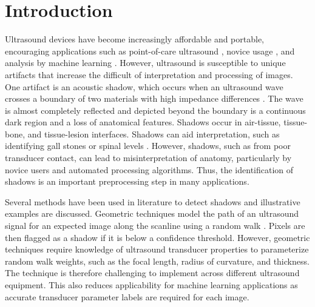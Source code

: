 \documentclass[authoryear,preprint,review,12pt]{elsarticle}
\begin{document}




\section*{Introduction}
\label{intro}
Ultrasound devices have become increasingly affordable and portable, encouraging applications such as point-of-care ultrasound \citep{Bouhemad2011}, novice usage \citep{Sippel2011}, and analysis by machine learning \citep{Ghose2013}. However, ultrasound is susceptible to unique artifacts that increase the difficult of interpretation and processing of images. One artifact is an acoustic shadow, which occurs when an ultrasound wave crosses a boundary of two materials with high impedance differences \citep{Kremkau1986}. The wave is almost completely reflected and depicted beyond the boundary is a continuous dark region and a loss of anatomical features. Shadows occur in air-tissue, tissue-bone, and tissue-lesion interfaces. Shadows can aid interpretation, such as identifying gall stones \citep{Good1979} or spinal levels \citep{Galiano2005}. However, shadows, such as from poor transducer contact, can lead to misinterpretation of anatomy, particularly by novice users and automated processing algorithms. Thus, the identification of shadows is an important preprocessing step in many applications.

Several methods have been used in literature to detect shadows and illustrative examples are discussed. Geometric techniques model the path of an ultrasound signal for an expected image along the scanline using a random walk \citep{Karamalis2012}. Pixels are then flagged as a shadow if it is below a confidence threshold. However, geometric techniques require knowledge of ultrasound transducer properties to parameterize random walk weights, such as the focal length, radius of curvature, and thickness. The technique is therefore challenging to implement across different ultrasound equipment. This also reduces applicability for machine learning applications as accurate transducer parameter labels are required for each image.
\end{document}
